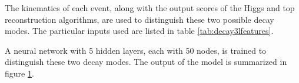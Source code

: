 The kinematics of each event, along with the output scores of the Higgs and top reconstruction algorithms, are used to distinguish these two possible decay modes. The particular inputs used are listed in table \ref{tab:decay3lfeatures}.



A neural network with 5 hidden layers, each with 50 nodes, is trained to distinguish these two decay modes. The output of the model is summarized in figure \ref{fig:decayResults}.

\begin{figure}[h!]
    \\
    \caption{}
    \label{fig:decayResults}
\end{figure}



